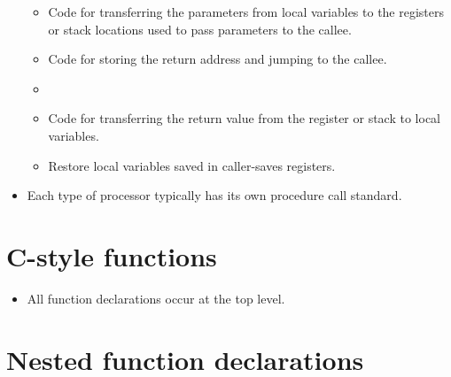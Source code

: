 \begin{itemize}
\begin{itemize}
\item Code for transferring the parameters from local variables to the
registers or stack locations used to pass parameters to the callee.

\item Code for storing the return address and jumping to the callee.

\item

\item Code for transferring the return value from the register or stack to
local variables.

\item Restore local variables saved in caller-saves registers.

\end{itemize}

\item Each type of processor typically has its own procedure call standard.

\end{itemize}

\section{C-style functions}

\begin{itemize}

\item All function declarations occur at the top level.

\end{itemize}

\section{Nested function declarations}

